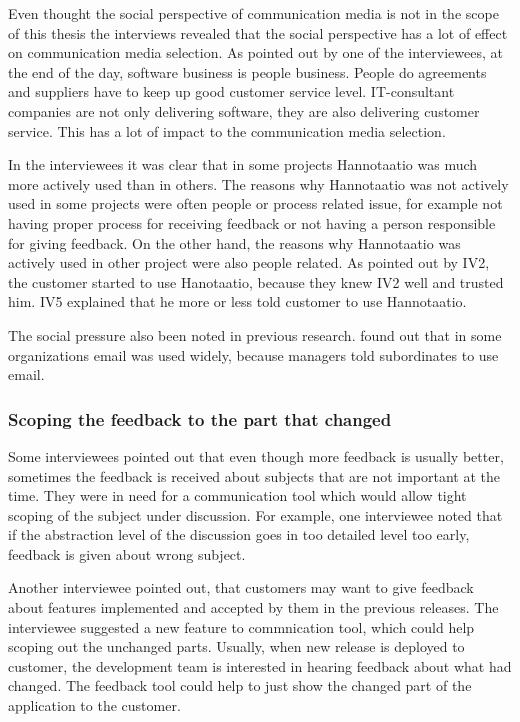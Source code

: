 \documentclass[english,12pt,a4paper,pdftex]{article}
\begin{document}
Even thought the social perspective of communication media is not in the scope of this thesis the interviews revealed that the social perspective has a lot of effect on communication media selection. As pointed out by one of the interviewees, at the end of the day, software business is people business. People do agreements and suppliers have to keep up good customer service level. IT-consultant companies are not only delivering software, they are also delivering customer service. This has a lot of impact to the communication media selection.

In the interviewees it was clear that in some projects Hannotaatio was much more actively used than in others. The reasons why Hannotaatio was not actively used in some projects were often people or process related issue, for example not having proper process for receiving feedback or not having a person responsible for giving feedback. On the other hand, the reasons why Hannotaatio was actively used in other project were also people related. As pointed out by IV2, the customer started to use Hanotaatio, because they knew IV2 well and trusted him. IV5 explained that he more or less told customer to use Hannotaatio.

The social pressure also been noted in previous research. \citet{elshinnawy1997} found out that in some organizations email was used widely, because managers told subordinates to use email.

\subsubsection{Scoping the feedback to the part that changed}

Some interviewees pointed out that even though more feedback is usually better, sometimes the feedback is received about subjects that are not important at the time. They were in need for a communication tool which would allow tight scoping of the subject under discussion. For example, one interviewee noted that if the abstraction level of the discussion goes in too detailed level too early, feedback is given about wrong subject.

Another interviewee pointed out, that customers may want to give feedback about features implemented and accepted by them in the previous releases. The interviewee suggested a new feature to commnication tool, which could help scoping out the unchanged parts. Usually, when new release is deployed to customer, the development team is interested in hearing feedback about what had changed. The feedback tool could help to just show the changed part of the application to the customer.
\end{document}

